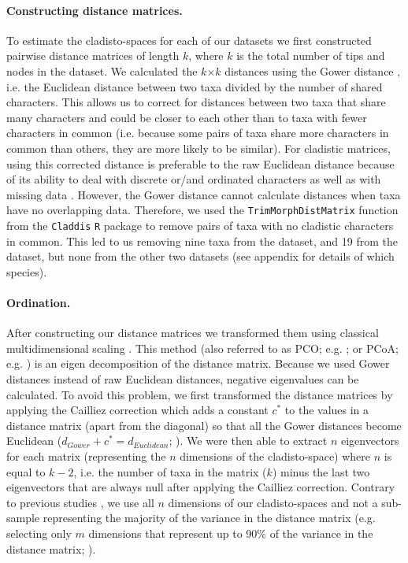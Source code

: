 \documentclass[12pt,a4paper]{article}
\begin{document}
\paragraph{Constructing distance matrices.}
To estimate the cladisto-spaces for each of our datasets we first constructed pairwise distance matrices of length $k$, where $k$ is the total number of tips and nodes in the dataset.
We calculated the $k$$\times$$k$ distances using the Gower distance \citep{Gower71}, i.e. the Euclidean distance between two taxa divided by the number of shared characters. 
This allows us to correct for distances between two taxa that share many characters and could be closer to each other than to taxa with fewer characters in common (i.e. because some pairs of taxa share more characters in common than others, they are more likely to be similar).
For cladistic matrices, using this corrected distance is preferable to the raw Euclidean distance because of its ability to deal with discrete or/and ordinated characters as well as with missing data \citep{anderson2012using}.
However, the Gower distance cannot calculate distances when taxa have no overlapping data.
Therefore, we used the \texttt{TrimMorphDistMatrix} function from the \texttt{Claddis} \texttt{R} package \citep{Claddis} to remove pairs of taxa with no cladistic characters in common.
This led to us removing nine taxa from the \cite{bapst2016topology} dataset, and 19 from the \cite{brusatte2014gradual} dataset, but none from the other two datasets (see appendix for details of which species). 

\paragraph{Ordination.}
After constructing our distance matrices we transformed them using classical multidimensional scaling \citep[MDS;][]{torgerson1965multidimensional,GOWER01121966,cailliez1983analytical}.
This method (also referred to as PCO; e.g. \citealt{Brusatte2015}; or PCoA; e.g. \citealt{paradisape:2004}) is an eigen decomposition of the distance matrix.
Because we used Gower distances instead of raw Euclidean distances, negative eigenvalues can be calculated.
To avoid this problem, we first transformed the distance matrices by applying the Cailliez correction \citep{cailliez1983analytical} which adds a constant $c^*$ to the values in a distance matrix (apart from the diagonal) so that all the Gower distances become Euclidean ($d_{Gower}+c^*=d_{Euclidean}$; \citealt{cailliez1983analytical}). 
We were then able to extract $n$ eigenvectors for each matrix (representing the $n$ dimensions of the cladisto-space) where $n$ is equal to $k-2$, i.e. the number of taxa in the matrix ($k$) minus the last two eigenvectors that are always null after applying the Cailliez correction.
Contrary to previous studies \citep[e.g][]{brusatte50,cisneros2010,prentice2011,anderson2012using,Hughes20082013,bentonmodels2014}, we use all $n$ dimensions of our cladisto-spaces and not a sub-sample representing the majority of the variance in the distance matrix (e.g. selecting only $m$ dimensions that represent up to 90\% of the variance in the distance matrix; \citealt{Brusatte12092008,toljagictriassic-jurassic2013}).
\end{document}
